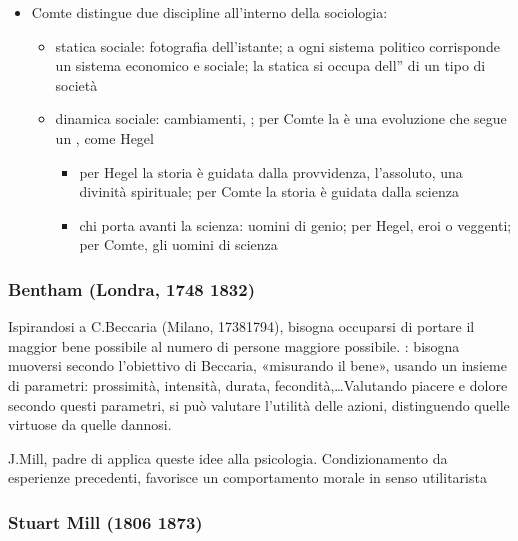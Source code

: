 \documentclass[letterpaper,10pt,italian]{jupyterBook}
\begin{document}
\begin{itemize}
\item {} 
\sphinxAtStartPar
{} Comte distingue due discipline all’interno della sociologia:
\begin{itemize}
\item {} 
\sphinxAtStartPar
statica sociale: fotografia dell’istante; a ogni sistema politico corrisponde un sistema economico e sociale; la statica si occupa dell” di un tipo di società

\item {} 
\sphinxAtStartPar
dinamica sociale: cambiamenti, ; per Comte la  è una evoluzione che segue un , come Hegel
\begin{itemize}
\item {} 
\sphinxAtStartPar
per Hegel la storia è guidata dalla provvidenza, l’assoluto, una divinità spirituale; per Comte la storia è guidata dalla scienza

\item {} 
\sphinxAtStartPar
chi porta avanti la scienza: uomini di genio; per Hegel, eroi o veggenti; per Comte, gli uomini di scienza

\end{itemize}

\end{itemize}

\end{itemize}
\label{\detokenize{ch/history:pc-bentham}}\subsubsection*{Bentham (Londra, 1748 \sphinxhyphen{} 1832)}

\sphinxAtStartPar
{} Ispirandosi a C.Beccaria (Milano, 1738\sphinxhyphen{}1794), bisogna occuparsi di portare il maggior bene possibile al numero di persone maggiore possibile. : bisogna muoversi secondo l’obiettivo di Beccaria, «misurando il bene», usando un insieme di parametri: prossimità, intensità, durata, fecondità,…Valutando piacere e dolore secondo questi parametri, si può valutare l’utilità delle azioni, distinguendo quelle virtuose da quelle dannosi.

\sphinxAtStartPar
J.Mill, padre di  applica queste idee alla psicologia. Condizionamento da esperienze precedenti, favorisce un comportamento morale in senso utilitarista
\label{\detokenize{ch/history:pc-stuart-mill}}\subsubsection*{Stuart Mill (1806 \sphinxhyphen{} 1873)}
\end{document}
